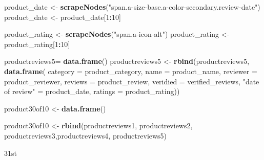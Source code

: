 \documentclass[
]{article}
\newenvironment{Shaded}{\begin{snugshade}}{\end{snugshade}}
\newcommand{\AttributeTok}[1]{\textcolor[rgb]{0.13,0.29,0.53}{#1}}
\newcommand{\DecValTok}[1]{\textcolor[rgb]{0.00,0.00,0.81}{#1}}
\newcommand{\FunctionTok}[1]{\textcolor[rgb]{0.13,0.29,0.53}{\textbf{#1}}}
\newcommand{\NormalTok}[1]{#1}
\newcommand{\OtherTok}[1]{\textcolor[rgb]{0.56,0.35,0.01}{#1}}
\newcommand{\SpecialCharTok}[1]{\textcolor[rgb]{0.81,0.36,0.00}{\textbf{#1}}}
\newcommand{\StringTok}[1]{\textcolor[rgb]{0.31,0.60,0.02}{#1}}
\begin{document}
\begin{Shaded}
\begin{Highlighting}[]
\NormalTok{  product\_date }\OtherTok{\textless{}{-}} \FunctionTok{scrapeNodes}\NormalTok{(}\StringTok{"span.a{-}size{-}base.a{-}color{-}secondary.review{-}date"}\NormalTok{)}
\NormalTok{  product\_date }\OtherTok{\textless{}{-}}\NormalTok{ product\_date[}\DecValTok{1}\SpecialCharTok{:}\DecValTok{10}\NormalTok{]}
  
\NormalTok{  product\_rating }\OtherTok{\textless{}{-}} \FunctionTok{scrapeNodes}\NormalTok{(}\StringTok{"span.a{-}icon{-}alt"}\NormalTok{)}
\NormalTok{  product\_rating }\OtherTok{\textless{}{-}}\NormalTok{ product\_rating[}\DecValTok{1}\SpecialCharTok{:}\DecValTok{10}\NormalTok{]}
  
\NormalTok{  productreviews5}\OtherTok{=} \FunctionTok{data.frame}\NormalTok{()}
\NormalTok{  productreviews5 }\OtherTok{\textless{}{-}} \FunctionTok{rbind}\NormalTok{(productreviews5, }\FunctionTok{data.frame}\NormalTok{(}
                      \AttributeTok{category =}\NormalTok{ product\_category,}
                      \AttributeTok{name =}\NormalTok{ product\_name,}
                      \AttributeTok{reviewer =}\NormalTok{ product\_reviewer,}
                      \AttributeTok{reviews =}\NormalTok{ product\_review,}
                      \AttributeTok{veridied =}\NormalTok{ verified\_reviews,}
                      \StringTok{"date of review"} \OtherTok{=}\NormalTok{ product\_date,}
                      \AttributeTok{ratings =}\NormalTok{ product\_rating))}
  
\NormalTok{  product30of10 }\OtherTok{\textless{}{-}} \FunctionTok{data.frame}\NormalTok{()}
  
\NormalTok{  product30of10 }\OtherTok{\textless{}{-}} \FunctionTok{rbind}\NormalTok{(productreviews1, productreviews2, productreviews3,productreviews4, productreviews5)}
\end{Highlighting}
\end{Shaded}

31st
\end{document}
